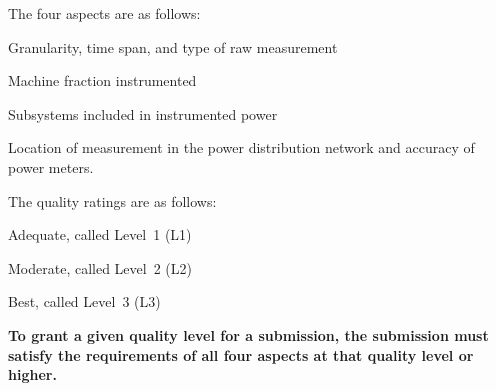 \noindent
The four aspects are as follows:

\begin{packed_enum}
\item 
Granularity, time span, and type of raw measurement
\item 
Machine fraction instrumented
\item 
Subsystems included in instrumented power
\item 
Location of measurement in the power distribution network and accuracy of power meters.
\end{packed_enum}

\noindent
The quality ratings are as follows:

\begin{packed_item}
\item 
Adequate, called Level~1 (L1)
\item
Moderate, called Level~2 (L2)
\item
Best, called Level~3 (L3)
\end{packed_item}

\noindent
\textbf{To grant a given quality level for a submission, the submission must
satisfy the requirements of all four aspects at that quality level
or higher.}

\noindent
